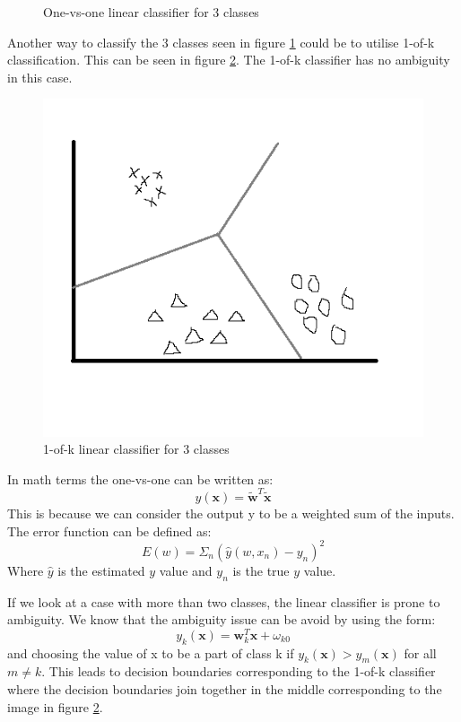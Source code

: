 \begin{figure}[H]
\begin{minipage}[b]{0.5\textwidth}
\caption{One-vs-one linear classifier for 3 classes}
\label{onevsone2}
\end{minipage}
\end{figure}
Another way to classify  the 3 classes seen in figure \ref{onevsone2} could be to utilise 1-of-k classification. This can be seen in figure \ref{oneofk1}. The 1-of-k classifier  has no ambiguity in this case.
\begin{figure}[H]
\centering
\includegraphics[scale=0.5]{billeder/oneofk1}
\caption{1-of-k linear classifier for 3 classes}
\label{oneofk1}
\end{figure}
In math terms the one-vs-one can be written as:
\begin{equation}
\label{oneofkcostfunc}
y(\textbf{x})=\tilde{\textbf{w}}^T\tilde{\textbf{x}}
\end{equation}
This is because we can consider the output y to be a weighted sum of the inputs. The error function can be defined as:
\begin{equation}
E(w) = \Sigma_n (\hat{y}(w,x_n) - y_n)^2
\end{equation}
Where $\hat{y}$ is the estimated $y$ value and $y_n$ is the true $y$ value.

If we look at a case with more than two classes, the linear classifier is prone to ambiguity. We know that the ambiguity issue can be avoid by using the form:
\begin{equation}
y_k(\textbf{x})=\textbf{w}_k^T\textbf{x}+\omega_{k0}
\end{equation}
and choosing the value of x to be a part of class k if $y_k(\textbf{x})>y_{m}(\textbf{x})$ for all $m \neq k$. This leads to decision boundaries corresponding to the 1-of-k classifier where the decision boundaries join together in the middle corresponding to the image in figure \ref{oneofk1}.\\\ \\


